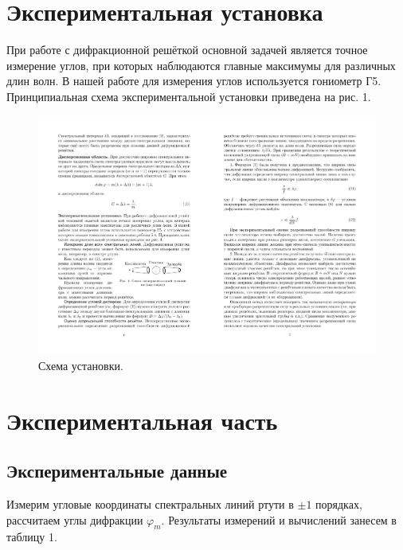 \documentclass[a4paper, 12pt]{article}%
\begin{document}
\section{Экспериментальная установка}
	При работе с дифракционной решёткой основной задачей является точное измерение углов, при которых наблюдаются главные максимумы для различных длин волн. В нашей работе для измерения углов используется гониометр Г5. Принципиальная схема экспериментальной установки приведена на рис. 1.
	\begin{figure}[h]
	\includegraphics[scale=1.5]{inst.pdf}
	\centering
	\caption{Схема установки.}
	\end{figure}


\newpage
\section{Экспериментальная часть}
	\subsection{Экспериментальные данные}
		Измерим угловые координаты спектральных линий ртути в $ \pm1 $ порядках, рассчитаем углы дифракции $\varphi_m$. Результаты измерений и вычислений занесем в таблицу 1.
\end{document}
